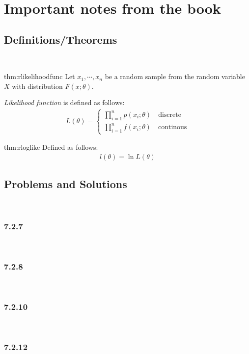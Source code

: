 \section{Important notes from the book}\par
\subsection{Definitions/Theorems}\hfill\\\par
\par\bigskip
\begin{theo}{thm:rlikelihoodfunc}
  Let $x_1,\cdots,x_n$ be a random sample from the random variable $X$ with distribution $F(x;\theta)$.\par
  \noindent\textit{Likelihood function} is defined as follows:
  \begin{equation*}
    \begin{gathered}
      L(\theta) = \begin{cases}\prod_{i=1}^{n}p(x_i;\theta)\quad\text{discrete}\\\prod_{i=1}^{n}f(x_i;\theta)\quad\text{continous}\end{cases}
    \end{gathered}
  \end{equation*}
\end{theo}
\par\bigskip
\begin{theo}[Loglikelihood]{thm:rloglike}
  Defined as follows:
  \begin{equation*}
    \begin{gathered}
      l(\theta) = \ln{L(\theta)}
    \end{gathered}
  \end{equation*}
\end{theo}

\subsection{Problems and Solutions}\hfill\\\par
\subsubsection{7.2.7}\hfill\\\par
\par\bigskip
\subsubsection{7.2.8}\hfill\\\par
\par\bigskip
\subsubsection{7.2.10}\hfill\\\par
\par\bigskip
\subsubsection{7.2.12}\hfill\\\par
\par\bigskip
